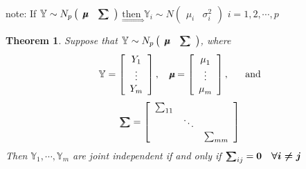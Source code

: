 \documentclass{article}
\newtheorem{theorem}{Theorem}
\begin{document}
\bigskip

note: If $\mathbb{Y}\sim N_{p}\left( 
\begin{array}{cc}
\mathbb{%
\mu\mkern-12.3mu\mu%
} & \mathbb{%
\tsum\mkern-20mu\tsum%
}%
\end{array}%
\right) $ $\underset{\Rightarrow }{\text{then }}\mathbb{Y}_{i}\sim N\left( 
\begin{array}{cc}
\mu _{i} & \sigma _{i}^{2}%
\end{array}%
\right) $\newline
$i=1,2,\cdots ,p$

\bigskip

\begin{theorem}
Suppose that $\mathbb{Y}\sim N_{p}\left( 
\begin{array}{cc}
\mathbb{%
\mu\mkern-12.3mu\mu%
} & \mathbb{%
\tsum\mkern-20mu\tsum%
}%
\end{array}%
\right) $, where%
\begin{equation*}
\mathbb{Y}=\left[ 
\begin{array}{c}
Y_{1} \\ 
\vdots \\ 
Y_{m}%
\end{array}%
\right] ,\quad \mathbb{%
\mu\mkern-12.3mu\mu%
}=\left[ 
\begin{array}{c}
\mu _{1} \\ 
\vdots \\ 
\mu _{m}%
\end{array}%
\right] ,\quad \text{and}
\end{equation*}%
\begin{equation*}
\mathbb{%
\tsum\mkern-20mu\tsum%
}=\left[ 
\begin{array}{ccc}
\tsum\nolimits_{11} &  &  \\ 
& \ddots &  \\ 
&  & \tsum\nolimits_{mm}%
\end{array}%
\right]
\end{equation*}%
Then $\mathbb{Y}_{1},\cdots ,\mathbb{Y}_{m}$ are joint independent if and
only if $\mathbb{%
\tsum\mkern-20mu\tsum%
}_{ij}=\boldsymbol{0\quad \forall i\neq j}$
\end{theorem}
\end{document}
